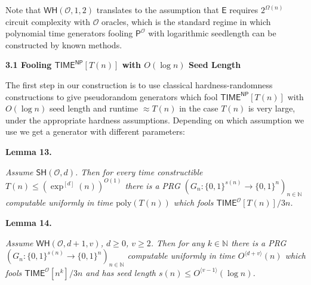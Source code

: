 


Note that $\mathsf{WH}(\mathcal{O},1,2)$ translates to the assumption that $\mathsf{E}$ requires $2^{\Omega(n)}$ circuit complexity with $\mathcal{O}$ oracles, which is the standard regime in which polynomial time generators fooling $\mathsf{P}^{\mathcal{O}}$ with logarithmic seedlength can be constructed by known methods.\par




\par\medskip\noindent\textbf{
3.1 Fooling ${\mathsf{TIME}}^{{\mathsf{NP}}}[T(n)]$ with $O(\log n)$ Seed Length}\par




The first step in our construction is to use classical hardness-randomness constructions to give pseudorandom generators which fool ${\mathsf{TIME}}^{{\mathsf{NP}}}[T(n)]$ with $O(\log n)$ seed length and runtime $\approx T(n)$ in the case $T(n)$ is very large, under the appropriate hardness assumptions. Depending on which assumption we use we get a generator with different parameters:\par





\par\medskip\noindent\textbf{
\textbf{Lemma 13}\textbf{.}
}\par



\emph{Assume $\mathsf{SH}(\mathcal{O},d)$. Then for every time constructible $T(n)\leq(\exp^{[d]}(n))^{O(1)}$ there is a PRG $(G_{n}:\{0,1\}^{s(n)}\to\{0,1\}^{n})_{n\in\mathbb{N}}$ computable uniformly in time $\mathrm{poly}(T(n))$ which fools ${\mathsf{TIME}}^{\mathcal{O}}[T(n)]/3n$.}\par







\par\medskip\noindent\textbf{
\textbf{Lemma 14}\textbf{.}
}\par



\emph{Assume $\mathsf{WH}(\mathcal{O},d+1,v)$, $d\geq 0$, $v\geq 2$. Then for any $k\in\mathbb{N}$ there is a PRG $(G_{n}:\{0,1\}^{s(n)}\to\{0,1\}^{n})_{n\in\mathbb{N}}$ computable uniformly in time $O^{\langle d+v\rangle}(n)$ which fools ${\mathsf{TIME}}^{\mathcal{O}}[n^{k}]/3n$ and has seed length $s(n)\leq O^{\langle v-1\rangle}(\log n)$.}\par



